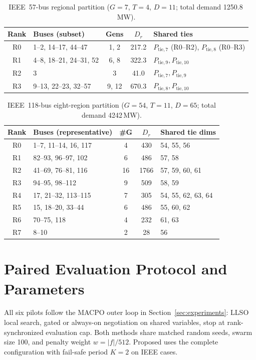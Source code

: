 \begin{table}[H]
\centering
\caption{IEEE~57-bus regional partition ($G{=}7$, $T{=}4$, $D{=}11$; total demand 1250.8\,MW).}
\label{tab:ieee57_partition}
\begin{tabular}{@{}clccp{}@{}}
\toprule
\textbf{Rank} & \textbf{Buses (subset)} & \textbf{Gens} & \textbf{$D_r$} & \textbf{Shared ties} \\
\midrule
R0 & 1--2, 14--17, 44--47 & 1, 2 & 217.2 & $P_{\mathrm{tie},7}$ (R0--R2), $P_{\mathrm{tie},8}$ (R0--R3) \\
R1 & 4--8, 18--21, 24--31, 52 & 6, 8 & 322.3 & $P_{\mathrm{tie},9},P_{\mathrm{tie},10}$ \\
R2 & 3 & 3 & 41.0 & $P_{\mathrm{tie},7},P_{\mathrm{tie},9}$ \\
R3 & 9--13, 22--23, 32--57 & 9, 12 & 670.3 & $P_{\mathrm{tie},8},P_{\mathrm{tie},10}$ \\
\bottomrule
\end{tabular}
\end{table}

\begin{table}[H]
\centering
\small
\caption{IEEE~118-bus eight-region partition ($G{=}54$, $T{=}11$, $D{=}65$; total demand 4242\,MW).}
\label{tab:ieee118_partition}
\begin{tabular}{@{}clccp{}@{}}
\toprule
\textbf{Rank} & \textbf{Buses (representative)} & \textbf{\#G} & \textbf{$D_r$} & \textbf{Shared tie dims} \\
\midrule
R0 & 1--7, 11--14, 16, 117 & 4 & 430 & 54, 55, 56 \\
R1 & 82--93, 96--97, 102 & 6 & 486 & 57, 58 \\
R2 & 41--69, 76--81, 116 & 16 & 1766 & 57, 59, 60, 61 \\
R3 & 94--95, 98--112 & 9 & 509 & 58, 59 \\
R4 & 17, 21--32, 113--115 & 7 & 305 & 54, 55, 62, 63, 64 \\
R5 & 15, 18--20, 33--44 & 6 & 486 & 55, 60, 62 \\
R6 & 70--75, 118 & 4 & 232 & 61, 63 \\
R7 & 8--10 & 2 & 28 & 56 \\
\bottomrule
\end{tabular}
\end{table}

\section{Paired Evaluation Protocol and Parameters}\label{app:scenario_experiments}
All six pilots follow the MACPO outer loop in Section~\ref{sec:experiments}: LLSO local search, gated or always-on negotiation on shared variables, stop at rank-synchronized evaluation cap. Both methods share matched random seeds, swarm size 100, and penalty weight $w=|f|/512$. Proposed uses the complete configuration with fail-safe period $K{=}2$ on IEEE cases.

